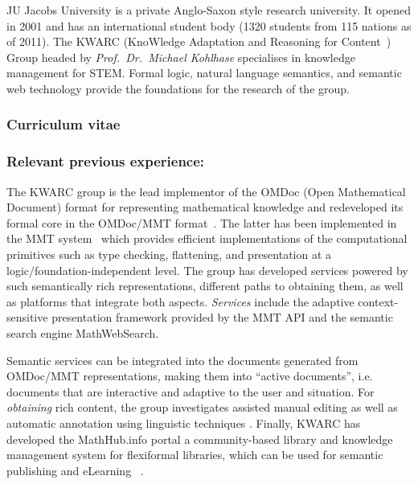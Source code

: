 \begin{sitedescription}{JU}
Jacobs University is a private Anglo-Saxon style research university.  It opened in 2001
and has an international student body (1320 students from 115 nations as of 2011).  The
KWARC (KnoWledge Adaptation and Reasoning for Content~\cite{KWARC:online}) Group headed by
{\emph{Prof.\ Dr.\ Michael Kohlhase}} specialises in knowledge management for STEM.
Formal logic, natural language semantics, and semantic web technology provide the
foundations for the research of the group.

\subsubsection*{Curriculum vitae}





\subsubsection*{Relevant previous experience:}

The KWARC group is the lead implementor of the OMDoc (Open Mathematical Document) format
for representing mathematical knowledge \cite{Kohlhase:OMDoc1.2} and redeveloped its
formal core in the OMDoc/MMT format~\cite{RabKoh:WSMSML13}. The latter has been
implemented in the MMT system~\cite{MMTSVN:on,RabKoh:WSMSML13} which provides efficient
implementations of the computational primitives such as type checking, flattening, and
presentation at a logic/foundation-independent level.  The group has developed services
powered by such semantically rich representations, different paths to obtaining them, as
well as platforms that integrate both aspects.  \emph{Services} include the adaptive
context-sensitive presentation framework provided by the MMT API and the semantic search
engine MathWebSearch\cite{KohSuc:asemf06,ProKoh:mwssofse12}. 

Semantic services can be integrated into the documents generated from OMDoc/MMT
representations, making them into ``active documents'', i.e. documents that are
interactive and adaptive to the user and situation.  For \emph{obtaining} rich content,
the group investigates assisted manual editing \cite{JucKoh:sidesc10:biblatex} as well as
automatic annotation using linguistic techniques \cite{GinJucAnc:alsaacl09}.  Finally,
KWARC has developed the \textsf{MathHub.info} portal a community-based library and
knowledge management system for flexiformal libraries, which can be used for semantic
publishing and eLearning~ \cite{KohDavGin:psewads11,MathHub:on,IanJucKoh:sdm14}.


\end{sitedescription}
